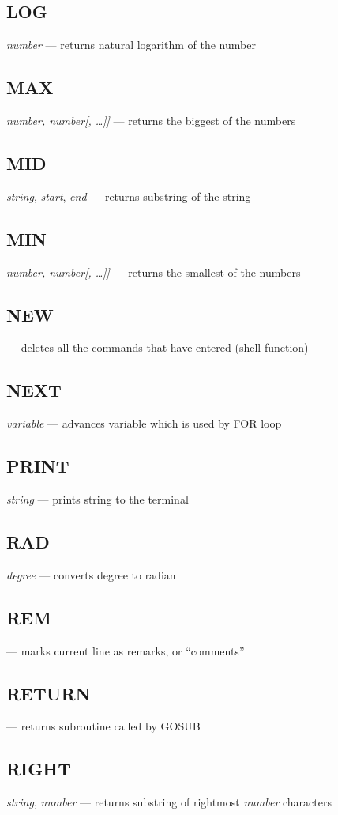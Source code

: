\subsection{LOG} \emph{number} --- returns natural logarithm of the number
\subsection{MAX} \emph{number, number[, \ldots]]} --- returns the biggest of the numbers
\subsection{MID} \emph{string}, \emph{start}, \emph{end} --- returns substring of the string
\subsection{MIN} \emph{number, number[, \ldots]]} --- returns the smallest of the numbers
\subsection{NEW} --- deletes all the commands that have entered (shell function)
\subsection{NEXT} \emph{variable} --- advances variable which is used by FOR loop
\subsection{PRINT} \emph{string} --- prints string to the terminal
\subsection{RAD} \emph{degree} --- converts degree to radian
\subsection{REM} --- marks current line as remarks, or ``comments''
\subsection{RETURN} --- returns subroutine called by GOSUB
\subsection{RIGHT} \emph{string}, \emph{number} --- returns substring of rightmost \emph{number} characters
